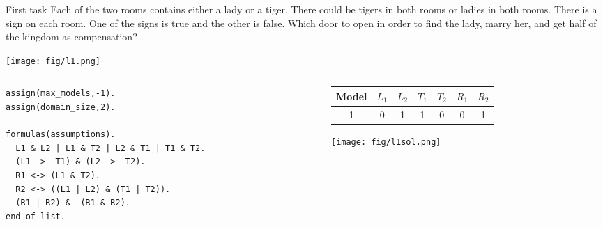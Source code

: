 \begin{frame}[fragile]
\begin{block}{First task}
Each of the two rooms contains either a lady or a tiger. There could be tigers in both
rooms or ladies in both rooms. There is a sign on each room. One of the signs is true and
the other is false. Which door to open in order to find the lady, marry her, and get half of
the kingdom as compensation? 
\end{block}

\begin{center}
\texttt{[image: fig/l1.png]}  
\end{center}

\begin{columns}
\begin{column}{0.55\textwidth}
\begin{lstlisting}
assign(max_models,-1).
assign(domain_size,2).

formulas(assumptions).
  L1 & L2 | L1 & T2 | L2 & T1 | T1 & T2.
  (L1 -> -T1) & (L2 -> -T2).
  R1 <-> (L1 & T2).
  R2 <-> ((L1 | L2) & (T1 | T2)).
  (R1 | R2) & -(R1 & R2).
end_of_list.
\end{lstlisting}
 \end{column}

\begin{column}{0.5\textwidth}
\begin{tabular}{c|cccccc}
 Model   & $L_1$ & $L_2$ & $T_1$ & $T_2$ & $R_1$ & $R_2$ \\
  \hline
  1 & 0 & 1 & 1 & 0 & 0 & 1\\
  \end{tabular}
\texttt{[image: fig/l1sol.png]} 
\end{column}
 
\end{columns}


\end{frame}

